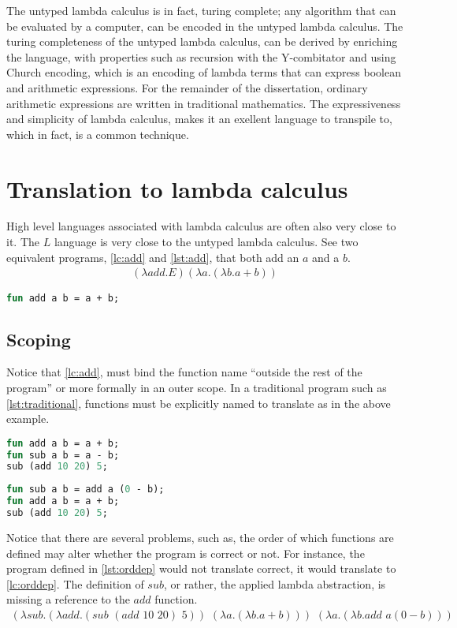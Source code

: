 \documentclass[11pt,oneside,a4paper]{report}
\begin{document}
The untyped lambda calculus is in fact, turing complete; any algorithm that can be evaluated by a computer, can be encoded in the untyped lambda calculus.
The turing completeness of the untyped lambda calculus, can be derived by enriching the language, with properties such as recursion with the Y-combitator and using Church encoding, which is an encoding of lambda terms that can express boolean and arithmetic expressions\cite{church1985calculi}.
For the remainder of the dissertation, ordinary arithmetic expressions are written in traditional mathematics.
The expressiveness and simplicity of lambda calculus, makes it an exellent language to transpile to, which in fact, is a common technique.

\section{Translation to lambda calculus}
High level languages associated with lambda calculus are often also very close to it.
The $L$ language is very close to the untyped lambda calculus.
See two equivalent programs, \autoref{lc:add} and \autoref{lst:add}, that both add an $a$ and a $b$.
\begin{align}
(\lambda add . E)(\lambda a . (\lambda b . a + b))
\label{lc:add}
\end{align}
\begin{lstlisting}[language=ML,caption={Add function},label={lst:add},xleftmargin=.35\textwidth]
fun add a b = a + b;
\end{lstlisting}

\subsection{Scoping}\label{scoping}
Notice that \autoref{lc:add}, must bind the function name ``outside the rest of the program'' or more formally in an outer scope.
In a traditional program such as \autoref{lst:traditional}, functions must be explicitly named to translate as in the above example.
\begin{lstlisting}[language=ML,caption={A traditional program},label={lst:traditional},xleftmargin=.32\textwidth]
fun add a b = a + b;
fun sub a b = a - b;
sub (add 10 20) 5;
\end{lstlisting}
\begin{lstlisting}[language=ML,caption={An order dependant program},label={lst:orddep},xleftmargin=.32\textwidth]
fun sub a b = add a (0 - b);
fun add a b = a + b;
sub (add 10 20) 5;
\end{lstlisting}
Notice that there are several problems, such as, the order of which functions are defined may alter whether the program is correct or not.
For instance, the program defined in \autoref{lst:orddep} would not translate correct, it would translate to \autoref{lc:orddep}.
The definition of $sub$, or rather, the applied lambda abstraction, is missing a reference to the $add$ function.
\begin{align}
(\lambda sub . (\lambda add . (sub \,\, (add \,\, 10 \,\, 20) \,\, 5)) \,\, (\lambda a . (\lambda b . a + b))) \,\, (\lambda a . (\lambda b . add \,\, a (0 - b)))
\label{lc:orddep}
\end{align}
\end{document}
